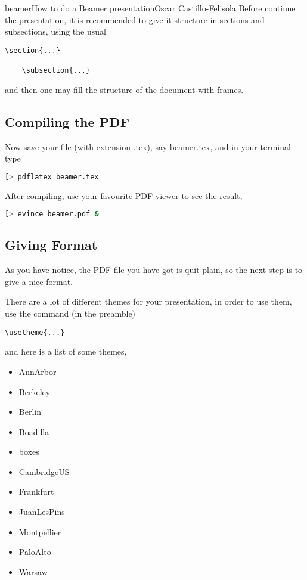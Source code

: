 \begin{article}[2]{beamer}{How to do a Beamer presentation}{Oscar Castillo-Felisola}
  Before continue the presentation, it is recommended to give it structure in sections and subsections, using the usual
  \begin{lstlisting}[style=LaTeX]
    \section{...}

    \subsection{...}
  \end{lstlisting}
  and then one may fill the structure of the document with frames.

  \subsection{Compiling the PDF}

  Now save your file (with extension .tex), say  beamer.tex, and in your terminal type

  \begin{lstlisting}[language=bash,style=StyleCommand]
    [> pdflatex beamer.tex
  \end{lstlisting}

  After compiling, use your favourite PDF viewer to see the result,

  \begin{lstlisting}[language=bash,style=StyleCommand]
    [> evince beamer.pdf &
  \end{lstlisting}

  \subsection{Giving Format}

  As you have notice, the PDF file you have got is quit plain, so the next step is to give a nice format.

  There are a lot of different themes for your presentation, in order to use them, use the command (in the preamble)
  \begin{lstlisting}[style=LaTeX]
    \usetheme{...}
  \end{lstlisting}
  and here is a list of some themes,
  \begin{itemize}
  \item AnnArbor
  \item Berkeley
  \item Berlin
  \item Boadilla
  \item boxes
  \item CambridgeUS
  \item Frankfurt
  \item JuanLesPins
  \item Montpellier
  \item PaloAlto
  \item Warsaw
  \end{itemize}


\end{article}
